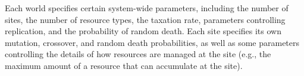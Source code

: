 



\label{dynamics:taxation}


\label{dynamics:ZAP}






Each world specifies certain system-wide
parameters, including the number of sites, the number of resource
types, the taxation rate, parameters controlling replication, and the
probability of random death.  Each site specifies its own mutation, crossover,
and random death probabilities, as well as some parameters controlling
the details of how resources are managed at the site (e.g., the
maximum amount of a resource that can accumulate at the site).


